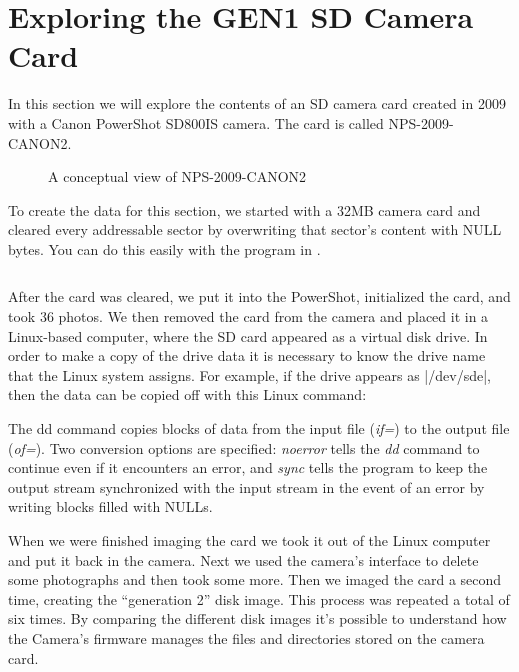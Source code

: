 \section{Exploring the GEN1 SD Camera Card}
In this section we will explore the contents of an SD camera card
created in 2009 with a Canon PowerShot SD800IS camera. The card is called NPS-2009-CANON2.

\begin{figure}
\caption{A conceptual view of NPS-2009-CANON2\label{nps-2009-canon2-conceptual}}
\end{figure}

To create the data for this section, we started with a 32MB camera
card and cleared every addressable sector by overwriting that sector's
content with NULL bytes. You can do this
easily with the program in .


\begin{figure}
\begin{lstlisting}
\end{lstlisting}
\caption{}\label{overwrite}
\end{figure}

After the card was cleared, we put it into the PowerShot, initialized
the card, and took 36 photos. We then removed the card from the
camera and placed it in a Linux-based computer, where the SD card
appeared as a virtual disk drive. In order to make a copy of the drive
data it is necessary to know the drive name that the Linux system
assigns. For example, if the drive appears as |/dev/sde|, then the
data can be copied off with this Linux  command:


The dd command copies blocks of data from the input file (\emph{if=})
to the output file (\emph{of=}). Two conversion options are
specified: \emph{noerror} tells the \emph{dd} command to continue even
if it encounters an error, and \emph{sync} tells the program to keep
the output stream synchronized with the input stream in the event of
an error by writing blocks filled with NULLs.  

When we were finished imaging the card we took it out of the Linux
computer and put it back in the camera. Next we used the camera's
interface to delete some photographs and then took some more. Then we
imaged the card a second time, creating the ``generation 2'' disk
image. This process was repeated a total of six times. By comparing
the different disk images it's possible to understand how the Camera's
firmware manages the files and directories stored on the camera card.

